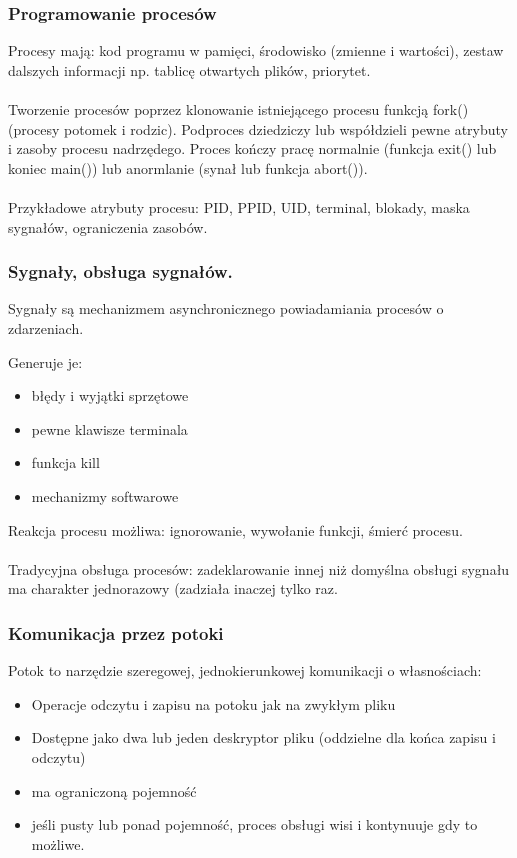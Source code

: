 \documentclass[a4paper,twoside]{report}
\begin{document}
\subsubsection{Programowanie procesów}
Procesy mają: kod programu w pamięci, środowisko (zmienne i wartości), zestaw dalszych informacji np. tablicę otwartych plików, priorytet. \\
\\
Tworzenie procesów poprzez klonowanie istniejącego procesu funkcją fork() (procesy potomek i rodzic). Podproces dziedziczy lub współdzieli pewne atrybuty i zasoby procesu nadrzędego. Proces kończy pracę normalnie (funkcja exit() lub koniec main()) lub anormlanie (synał lub funkcja abort()).\\ 
\\
Przykładowe atrybuty procesu:  PID, PPID, UID, terminal, blokady, maska sygnałów, ograniczenia zasobów.

\subsubsection{Sygnały, obsługa sygnałów.}

Sygnały są mechanizmem asynchronicznego powiadamiania procesów o zdarzeniach. 

Generuje je:
\begin{itemize}
	\item błędy i wyjątki sprzętowe
	\item pewne klawisze terminala
	\item funkcja kill
	\item mechanizmy softwarowe
\end{itemize}

Reakcja procesu możliwa: ignorowanie, wywołanie funkcji, śmierć procesu.\\
\\
Tradycyjna obsługa procesów: zadeklarowanie innej niż domyślna obsługi sygnału ma charakter jednorazowy (zadziała inaczej tylko raz.

\subsubsection{Komunikacja przez potoki}

Potok to narzędzie szeregowej, jednokierunkowej komunikacji o własnościach:
\begin{itemize}
	\item Operacje odczytu i zapisu na potoku jak na zwykłym pliku
	\item Dostępne jako dwa lub jeden deskryptor pliku (oddzielne dla końca zapisu i odczytu)
	\item ma ograniczoną pojemność
	\item jeśli pusty lub ponad pojemność, proces obsługi wisi i kontynuuje gdy to możliwe.
	
\end{itemize}
\end{document}
